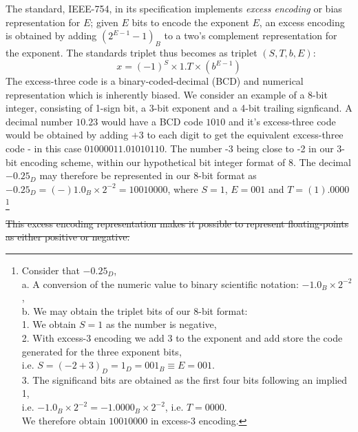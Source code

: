 \documentclass[7pt]{article}
\begin{document}
The standard, IEEE-754, in its specification implements \textit{excess encoding} or bias representation for $E$;  given $E$ bits to encode the exponent $E$, an excess encoding is obtained by adding $(2^{E-1} - 1)_B$ to a two's complement representation for the exponent. The standards triplet thus becomes as triplet $(S, T, b, E)$:
\begin{equation}
x = (-1)^{S}\times 1 . T \times (b^{E-1})
\end{equation}
The excess-three code is a binary-coded-decimal (BCD) and numerical representation which is inherently biased. We consider an example of a 8-bit integer, consisting of 1-sign bit, a 3-bit exponent and a 4-bit trailing signficand. A decimal number $10.23$ would have a BCD code $1010$ and it's excess-three code would be obtained by adding $+3$ to each digit to get the equivalent excess-three code - in this case $0100 0011.0101 0110$. The number -3 being close to -2 in our 3-bit encoding scheme, within our hypothetical bit integer format of 8. The decimal $-0.25_D$ may therefore be represented in our 8-bit format as $-0.25_D = (-)1.0_B \times 2^{-2} = 1 001 0000 $, where $S=1$, $E = 001$ and $T = (1).0000$
\footnote{
Consider that $-0.25_D$, \\ a.  A conversion of the numeric value to binary scientific notation: $ -1.0_B \times 2^{-2}$, \\
b. We may obtain the triplet bits of our 8-bit format: \\
     	1. We obtain $S = 1$ as the number is negative, \\
      2. With excess-3 encoding we add 3 to the exponent and add store the code generated for the three exponent bits, \\
      i.e. $S = (-2 + 3)_{D} = 1_{D} = 001_{B} \equiv E = 001$. \\
      3. The significand bits are  obtained as the first four bits following an implied 1, \\
       i.e. $-1.0_B \times 2^{-2} = -1.0000_B \times 2^{-2}$, i.e. $T = 0000$. \\
We therefore obtain $1 001 0000$ in excess-3 encoding. 
}

\st{This excess encoding representation makes it possible to represent floating-points as either positive or negative.}
\end{document}
